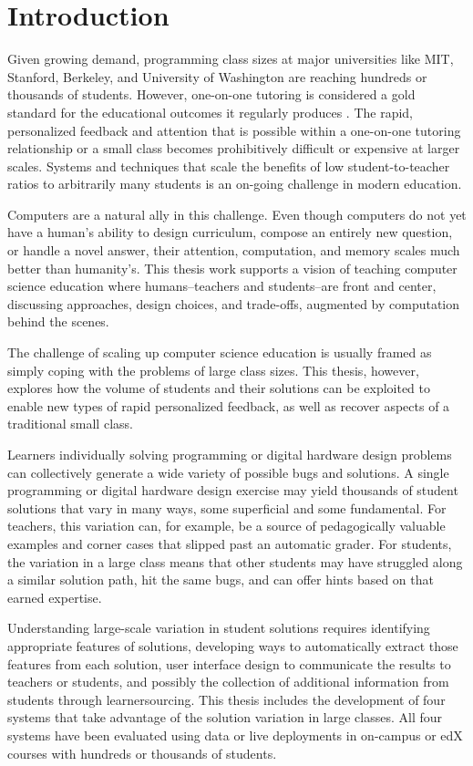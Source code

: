 \chapter{Introduction}\label{chapter:introduction}

Given growing demand, programming class sizes at major universities like MIT, Stanford, Berkeley, and University of Washington are reaching hundreds or thousands of students. However, one-on-one tutoring is considered a gold standard for the educational outcomes it regularly produces \cite{bloom}. The rapid, personalized feedback and attention that is possible within a one-on-one tutoring relationship or a small class becomes prohibitively difficult or expensive at larger scales. Systems and techniques that scale the benefits of low student-to-teacher ratios to arbitrarily many students is an on-going challenge in modern education.

Computers are a natural ally in this challenge. Even though computers do not yet have a human's ability to design curriculum, compose an entirely new question, or handle a novel answer, their attention, computation, and memory scales much better than humanity's. This thesis work supports a vision of teaching computer science education where humans--teachers and students--are front and center, discussing approaches, design choices, and trade-offs, augmented by computation behind the scenes.

The challenge of scaling up computer science education is usually framed as simply coping with the problems of large class sizes. This thesis, however, explores how the volume of students and their solutions can be exploited to enable new types of rapid personalized feedback, as well as recover aspects of a traditional small class.

Learners individually solving programming or digital hardware design problems can collectively generate a wide variety of possible bugs and solutions. A single programming or digital hardware design exercise may yield thousands of student solutions that vary in many ways, some superficial and some fundamental. For teachers, this variation can, for example, be a source of pedagogically valuable examples and corner cases that slipped past an automatic grader. For students, the variation in a large class means that other students may have struggled along a similar solution path, hit the same bugs, and can offer hints based on that earned expertise. 

Understanding large-scale variation in student solutions requires identifying appropriate features of solutions, developing ways to automatically extract those features from each solution, user interface design to communicate the results to teachers or students, and possibly the collection of additional information from students through learnersourcing. This thesis includes the development of four systems that take advantage of the solution variation in large classes. All four systems have been evaluated using data or live deployments in on-campus or edX courses with hundreds or thousands of students.

